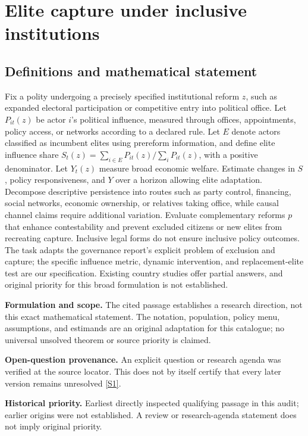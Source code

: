 \documentclass[11pt]{article}
\newcommand{\sref}[2]{\hyperlink{source:#1:#2}{[S#2]}}
\begin{document}
\section*{Elite capture under inclusive institutions}\label{30007667}
\subsection{Definitions and mathematical statement}
Fix a polity undergoing a precisely specified institutional reform \(z\), such as expanded electoral participation or competitive entry into political office. Let \(P_{it}(z)\) be actor \(i\)'s political influence, measured through offices, appointments, policy access, or networks according to a declared rule. Let \(E\) denote actors classified as incumbent elites using prereform information, and define elite influence share \(S_t(z)=\sum_{i\in E}P_{it}(z)/\sum_iP_{it}(z)\), with a positive denominator. Let \(Y_t(z)\) measure broad economic welfare. Estimate changes in \(S\), policy responsiveness, and \(Y\) over a horizon allowing elite adaptation. Decompose descriptive persistence into routes such as party control, financing, social networks, economic ownership, or relatives taking office, while causal channel claims require additional variation. Evaluate complementary reforms \(p\) that enhance contestability and prevent excluded citizens or new elites from recreating capture. Inclusive legal forms do not ensure inclusive policy outcomes. The task adapts the governance report's explicit problem of exclusion and capture; the specific influence metric, dynamic intervention, and replacement-elite test are our specification. Existing country studies offer partial answers, and original priority for this broad formulation is not established.

\par\textbf{Formulation and scope.} The cited passage establishes a research direction, not this exact mathematical statement. The notation, population, policy menu, assumptions, and estimands are an original adaptation for this catalogue; no universal unsolved theorem or source priority is claimed.

\par\textbf{Open-question provenance.} An explicit question or research agenda was verified at the source locator. This does not by itself certify that every later version remains unresolved \sref{30007667}{1}.

\par\textbf{Historical priority.} Earliest directly inspected qualifying passage in this audit; earlier origins were not established. A review or research-agenda statement does not imply original priority.
\end{document}
